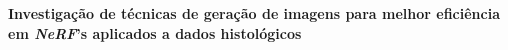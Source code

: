 \documentclass[12pt,a4paper]{article}
\begin{document}



%



{\large \bfseries Investigação de técnicas de geração de imagens para melhor eficiência em \textit{NeRF}'s aplicados a dados histológicos}










\end{document}
